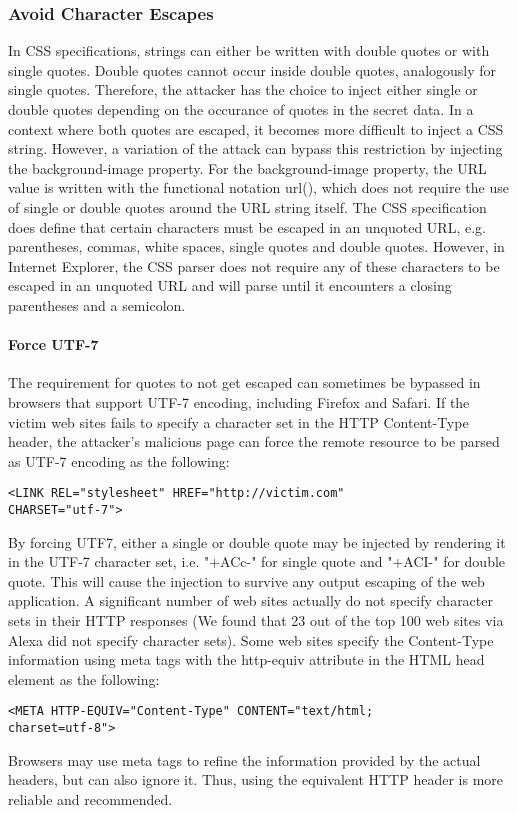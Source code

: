 \documentclass{acm_proc_article-sp}
\begin{document}
\subsubsection{Avoid Character Escapes}
In CSS specifications\cite{css}, strings can either be written with double quotes or with single quotes. Double quotes cannot occur inside double quotes, analogously for single quotes. Therefore, the attacker has the choice to inject either single or double quotes depending on the occurance of quotes in the secret data. In a context where both quotes are escaped, it becomes more difficult to inject a CSS string. However, a variation of the attack  can bypass this restriction by injecting the background-image property. For the background-image property, the URL value is written with the functional notation url(), which does not require the use of single or double quotes around the URL string itself. The CSS specification does define that certain characters must be escaped in an unquoted URL, e.g. parentheses, commas, white spaces, single quotes and double quotes. However, in Internet Explorer, the CSS parser does not require any of these characters to be escaped in an unquoted URL and will parse until it encounters a closing parentheses and a semicolon.

\paragraph{Force UTF-7}
The requirement for quotes to not get escaped can sometimes be bypassed in browsers that support UTF-7 encoding, including Firefox and Safari. If the victim web sites fails to specify a character set in the HTTP  Content-Type header, the attacker's malicious page can force the remote resource to be parsed as UTF-7 encoding as the following:
\begin{verbatim}
<LINK REL="stylesheet" HREF="http://victim.com" 
CHARSET="utf-7">
\end{verbatim}
By forcing UTF7, either a single or double quote may be injected by rendering it in the UTF-7 character set, i.e. "+ACc-" for single quote and "+ACI-" for double quote. This will cause the injection to survive any output escaping of the web application. A significant number of web sites actually do not specify character sets in their HTTP responses (We found that 23 out of the top 100 web sites via Alexa\cite{alexa} did not specify character sets). Some web sites specify the Content-Type information using meta tags with the http-equiv attribute in the HTML head element as the following:
\begin{verbatim}
<META HTTP-EQUIV="Content-Type" CONTENT="text/html; 
charset=utf-8">
\end{verbatim}
Browsers may use meta tags to refine the information provided by the actual headers, but can also ignore it. Thus, using the equivalent HTTP header is more reliable and recommended.
\end{document}
